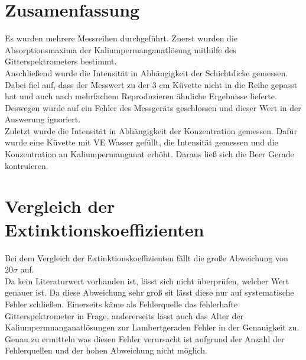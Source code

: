 
\section{Zusamenfassung}

Es wurden mehrere Messreihen durchgeführt. Zuerst wurden die
Absorptionsmaxima der Kaliumpermanganatlösung mithilfe des Gitterspektrometers bestimmt.\\
Anschließend wurde die Intensität in Abhängigkeit der Schichtdicke gemessen. Dabei fiel auf,
dass der Messwert zu der 3 cm Küvette nicht in die Reihe gepasst hat und auch nach mehrfachem
Reproduzieren ähnliche Ergebnisse lieferte. Deswegen wurde auf ein Fehler des Messgeräts geschlossen
und dieser Wert in der Auswerung ignoriert.\\ 
Zuletzt wurde die Intensität in Abhängigkeit der Konzentration gemessen. Dafür wurde eine Küvette
mit VE Wasser gefüllt, die Intensität gemessen und die Konzentration an Kaliumpermanganat erhöht.
Daraus ließ sich die Beer Gerade kontruieren.

\section{Vergleich der Extinktionskoeffizienten}

Bei dem Vergleich der Extinktionskoeffizienten fällt die große Abweichung von
$20 \sigma$ auf. \\
Da kein Literaturwert vorhanden ist, lässt sich nicht überprüfen, welcher Wert
genauer ist. Da diese Abweichung sehr groß sit lässt diese nur auf systematische
Fehler schließen. Einerseits käme als Fehlerquelle das fehlerhafte Gitterspektrometer in Frage,
andererseits lässt auch das Alter der Kaliumpermnanganatlösungen zur Lambertgeraden
Fehler in der Genauigkeit zu. Genau zu ermitteln was diesen Fehler verursacht ist aufgrund 
der Anzahl der Fehlerquellen und der hohen Abweichung nicht möglich.
